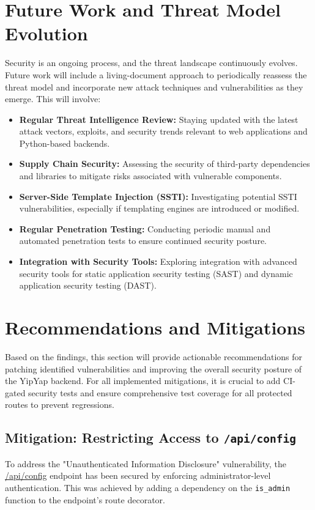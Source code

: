 \documentclass{article}
\begin{document}
\section{Future Work and Threat Model Evolution}
Security is an ongoing process, and the threat landscape continuously evolves. Future work will include a living-document approach to periodically reassess the threat model and incorporate new attack techniques and vulnerabilities as they emerge. This will involve:
\begin{itemize}
    \item \textbf{Regular Threat Intelligence Review:} Staying updated with the latest attack vectors, exploits, and security trends relevant to web applications and Python-based backends.
    \item \textbf{Supply Chain Security:} Assessing the security of third-party dependencies and libraries to mitigate risks associated with vulnerable components.
    \item \textbf{Server-Side Template Injection (SSTI):} Investigating potential SSTI vulnerabilities, especially if templating engines are introduced or modified.
    \item \textbf{Regular Penetration Testing:} Conducting periodic manual and automated penetration tests to ensure continued security posture.
    \item \textbf{Integration with Security Tools:} Exploring integration with advanced security tools for static application security testing (SAST) and dynamic application security testing (DAST).
\end{itemize}

\section{Recommendations and Mitigations}
Based on the findings, this section will provide actionable recommendations for patching identified vulnerabilities and improving the overall security posture of the YipYap backend. For all implemented mitigations, it is crucial to add CI-gated security tests and ensure comprehensive test coverage for all protected routes to prevent regressions.

\subsection{\texorpdfstring{\textbf{Mitigation: Restricting Access to \texttt{/api/config}}}{Mitigation: Restricting Access to /api/config}}
To address the "Unauthenticated Information Disclosure" vulnerability, the \url{/api/config} endpoint has been secured by enforcing administrator-level authentication. This was achieved by adding a dependency on the \texttt{is\_admin} function to the endpoint's route decorator.
\end{document}
